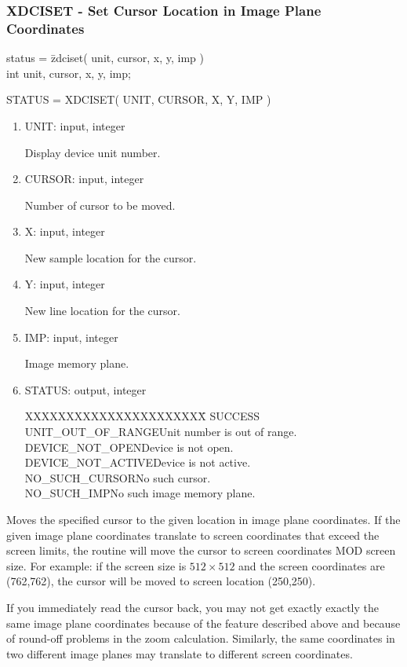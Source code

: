 \subsubsection{XDCISET - Set Cursor Location in Image Plane Coordinates}
\begin{tabbing}
status = \=zdciset( unit, cursor, x, y, imp )\\
\>int  unit, cursor, x, y, imp;\\
\end{tabbing}
STATUS = XDCISET( UNIT, CURSOR, X, Y, IMP )
\begin{enumerate}
\item UNIT:  input, integer

Display device unit number.
\item CURSOR:  input, integer

Number of cursor to be moved.
\item X:  input, integer

New sample location for the cursor.
\item Y:  input, integer

New line location for the cursor.
\item IMP:  input, integer

Image memory plane.
\item STATUS:  output, integer
\begin{tabbing}
XXXXXXXXXXXXXXXXXXXXXX\=\kill
SUCCESS\\
UNIT\_OUT\_OF\_RANGE\>Unit number is out of range.\\
DEVICE\_NOT\_OPEN\>Device is not open.\\
DEVICE\_NOT\_ACTIVE\>Device is not active.\\
NO\_SUCH\_CURSOR\>No such cursor.\\
NO\_SUCH\_IMP\>No such image memory plane.\\
\end{tabbing}
\end{enumerate}
Moves the specified cursor to the given location in image plane
coordinates.  If the given image plane coordinates translate to
screen coordinates that exceed the screen limits, the routine
will move the cursor to screen coordinates MOD screen size.  For
example:  if the screen size is $512 \times 512$ and the screen coordinates
are (762,762), the cursor will be moved to screen location (250,250).

If you immediately read the cursor back, you may not get exactly
exactly the same image plane coordinates because of the feature
described above and because of round-off problems in the zoom
calculation.  Similarly, the same coordinates in two different
image planes may translate to different screen coordinates.

